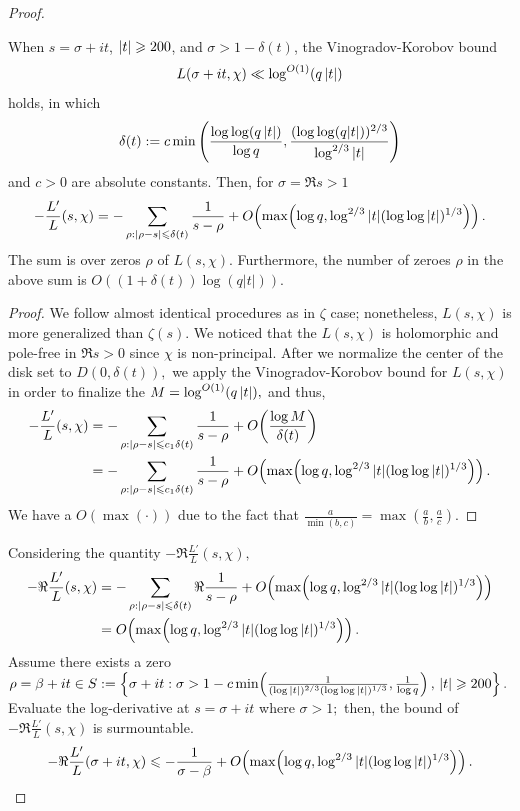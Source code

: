 \begin{proof}
\begin{corollary}
    When $s = \sigma + it$, $|t| \geqslant 200$, and $\sigma > 1 - \delta(t)$, the Vinogradov-Korobov bound $$L(\sigma + it, \chi) \ll \log^{O(1)} (q\left\lvert t \right\rvert)$$ holds, in which $$\delta(t) := c \min\left( \frac{\log\log(q\left\lvert t \right\rvert)}{\log q}, \frac{(\log\log(q|t|))^{2/3}}{\log^{2/3} |t|} \right)$$ and $c > 0$ are absolute constants. Then, for $\sigma = \Re s > 1$
    \begin{equation}
        -\frac{L'}{L}(s, \chi) = -\sum_{\rho: |\rho - s| \leqslant \delta(t)} \frac{1}{s - \rho} + O\! \left( \max\!\left( \log q, \log^{2/3} |t| (\log \log |t|)^{1/3} \right) \right).
    \end{equation}
    The sum is over zeros $\rho$ of $L(s, \chi)$. Furthermore, the number of zeroes $\rho$ in the above sum is $O((1+\delta(t))\log(q|t|)).$
\end{corollary}
\begin{proof}
We follow almost identical procedures as in $\zeta$ case; nonetheless, $L(s, \chi)$ is more generalized than $\zeta(s).$ We noticed that the $L(s, \chi)$ is holomorphic and pole-free in $\Re s > 0$ since $\chi$ is non-principal. After we normalize the center of the disk set to $D(0, \delta(t)),$ we apply the Vinogradov-Korobov bound for $L(s, \chi)$ in order to finalize the $M = \log^{O(1)} (q \left\lvert t \right\rvert),$ and thus, 
\begin{align*}
    -\frac{L'}{L}(s, \chi) &= -\sum_{\rho: |\rho - s| \leqslant c_1 \delta(t)} \frac{1}{s - \rho} + O\! \left( \frac{\log M}{\delta(t)} \right) \\
    &= -\sum_{\rho: |\rho - s| \leqslant c_1 \delta(t)} \frac{1}{s - \rho} + O\! \left( \max\!\left( \log q, \log^{2/3} |t| (\log \log |t|)^{1/3} \right) \right).
\end{align*}
We have a $O(\max(\cdot))$ due to the fact that $\frac{a}{\min(b, c)} = \max(\frac{a}{b}, \frac{a}{c}).$
\end{proof}

Considering the quantity $-\Re \frac{L'}{L}(s, \chi),$
\begin{align*}
    -\Re \frac{L'}{L}(s, \chi) &= -\sum_{\rho: |\rho - s| \leqslant \delta(t)} \Re \frac{1}{s - \rho} + O\! \left( \max\!\left( \log q, \log^{2/3} |t| (\log \log |t|)^{1/3} \right) \right) \\
    &= O\! \left( \max\!\left( \log q, \log^{2/3} |t| (\log \log |t|)^{1/3} \right) \right).
\end{align*}
Assume there exists a zero $\rho = \beta + it \in S := \left\{ \sigma + it : \sigma > 1 - c \min\!\left( \frac{1}{(\log |t|)^{2/3} (\log\log |t|)^{1/3}}, \frac{1}{\log q} \right), \, |t| \geqslant 200 \right\}.$ Evaluate the log-derivative at $s = \sigma + it$ where $\sigma > 1;$ then, the bound of $-\Re \frac{L'}{L}(s, \chi)$ is surmountable. $$-\Re \frac{L'}{L}(\sigma + it, \chi) \leqslant - \frac{1}{\sigma - \beta} + O\! \left( \max\!\left( \log q, \log^{2/3} |t| (\log \log |t|)^{1/3} \right) \right).$$ 


\end{proof}
